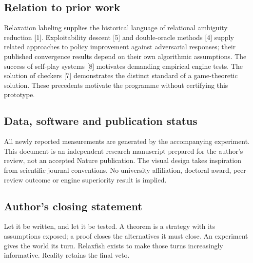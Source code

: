 \documentclass[10pt]{article}
\begin{document}
\subsection*{Relation to prior work}
Relaxation labeling supplies the historical language of relational ambiguity reduction [1]. Exploitability descent [5] and double-oracle methods [4] supply related approaches to policy improvement against adversarial responses; their published convergence results depend on their own algorithmic assumptions. The success of self-play systems [8] motivates demanding empirical engine tests. The solution of checkers [7] demonstrates the distinct standard of a game-theoretic solution. These precedents motivate the programme without certifying this prototype.

\subsection*{Data, software and publication status}
All newly reported measurements are generated by the accompanying experiment. This document is an independent research manuscript prepared for the author's review, not an accepted Nature publication. The visual design takes inspiration from scientific journal conventions. No university affiliation, doctoral award, peer-review outcome or engine superiority result is implied.

\subsection*{Author's closing statement}
Let it be written, and let it be tested. A theorem is a strategy with its assumptions exposed; a proof closes the alternatives it must close. An experiment gives the world its turn. Relaxfish exists to make those turns increasingly informative. Reality retains the final veto.
\end{document}
